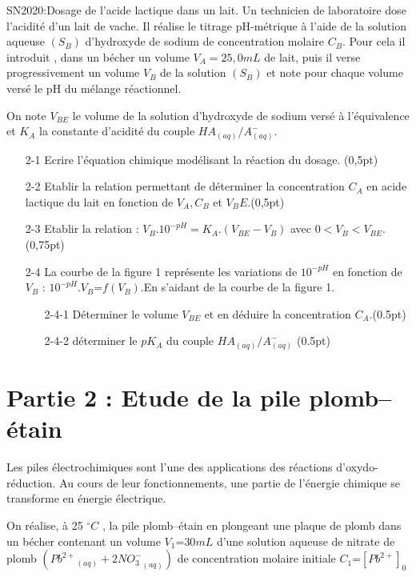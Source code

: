 \documentclass[12pt]{article}
\begin{document}
\begin{Box2}{SN2020:Dosage de l’acide lactique dans un lait.}
  Un technicien de laboratoire dose l’acidité d’un lait de vache. Il réalise le titrage pH-métrique à l’aide de la
  solution aqueuse $(S_B)$ d’hydroxyde de sodium de concentration molaire $C_B$. Pour cela il introduit , dans un
bécher un volume $V_A = 25,0mL$
de lait, puis il verse progressivement un volume $V_B$
de la solution $(S_B)$ et note
pour chaque volume versé le pH du mélange réactionnel.

On note $V_{BE}$
le volume de la solution d’hydroxyde de sodium versé à l’équivalence et
  $K_A$ la constante d’acidité du couple $HA_{(aq)}/ A^-_{(aq)}$.

  \begin{enumerate}
    \item[2-1] Ecrire l’équation chimique modélisant la réaction du dosage. (0,5pt)
    \item[2-2] Etablir la relation permettant de déterminer la concentration $C_A$ en acide lactique du lait en fonction de $V_A, C_B$ et $V_BE$.(0,5pt)
    \item[2-3] Etablir la relation : $V_B.10^{-pH} = K_A.(V_{BE} - V_B)$ avec $0<V_B<V_{BE}$.(0,75pt)
    \item[2-4] La courbe de la figure 1 représente les variations de $10^{-pH}$ en fonction de $V_B$ : $10^{-pH}.V_B$=$ f(V_B)$.En s’aidant de la courbe de la figure 1.
      \begin{enumerate}
        \item[2-4-1] Déterminer le volume $V_{BE}$ et en déduire la concentration $C_A$.(0.5pt)
        \item[2-4-2] déterminer le $pK_A$ du couple $HA_{(aq)}/ A^-_{(aq)}$ (0.5pt)
      \end{enumerate}
  \end{enumerate}


\end{Box2}

 \section*{Partie 2 : Etude de la pile plomb–étain}
 Les piles électrochimiques sont l’une des applications des réactions d’oxydo-réduction. Au cours de leur
fonctionnements, une partie de l’énergie chimique se transforme en énergie électrique.

On réalise, à 25 $^{\circ}C$ , la pile plomb–étain en plongeant une plaque de plomb dans un bécher contenant un 
volume $V_1 $=$30mL$ d’une solution aqueuse de nitrate de plomb $({Pb^{2+}}_{(aq)} + {2NO_3^-}_{(aq)} )$
de concentration molaire initiale $C_1$=$[Pb^{2+}]_0$ 
\end{document}
